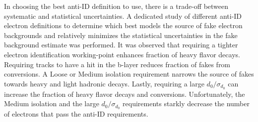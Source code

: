 In choosing the best anti-ID definition to use, there is a trade-off between systematic and statistical uncertainties.  A dedicated study of different anti-ID electron definitions to determine which best models the source of fake electron backgrounds and relatively minimizes the statistical uncertainties in the fake background estimate was performed.  It was observed that requiring a tighter electron identification working-point enhances fraction of heavy flavor decays.  Requiring tracks to have a hit in the b-layer reduces fraction of fakes from conversions.  A Loose or Medium isolation requirement narrows the source of fakes towards heavy and light hadronic decays.  Lastly, requiring a large $d_0/\sigma_{d_0}$ can increase the fraction of heavy flavor decays and conversions.  Unfortunately, the Medium isolation and the large $d_0/\sigma_{d_0}$ requirements starkly decrease the number of electrons that pass the anti-ID requirements.
